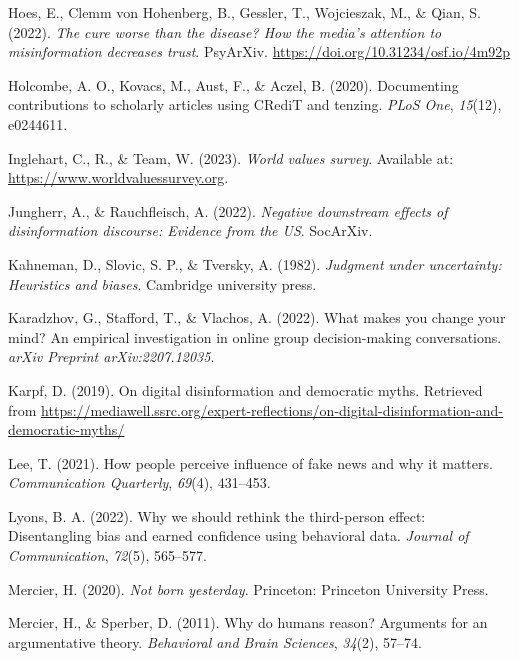 \documentclass[
  ,jou,floatsintext]{apa6}
\newlength{\cslhangindent}
\newlength{\cslentryspacingunit} %
\newenvironment{CSLReferences}[2] %
 {%
  \setlength{\parindent}{0pt}
  \ifodd #1
  \let\oldpar\par
  \def\par{\hangindent=\cslhangindent\oldpar}
  \fi
  \setlength{\parskip}{#2\cslentryspacingunit}
 }%
 {}
\begin{document}
\begin{CSLReferences}{1}{0}
\leavevmode{}%
Hoes, E., Clemm von Hohenberg, B., Gessler, T., Wojcieszak, M., \& Qian, S. (2022). \emph{The cure worse than the disease? How the media's attention to misinformation decreases trust}. PsyArXiv. \url{https://doi.org/10.31234/osf.io/4m92p}

\leavevmode{}%
Holcombe, A. O., Kovacs, M., Aust, F., \& Aczel, B. (2020). Documenting contributions to scholarly articles using CRediT and tenzing. \emph{PLoS One}, \emph{15}(12), e0244611.

\leavevmode{}%
Inglehart, C., R., \& Team, W. (2023). \emph{World values survey}. Available at: \url{https://www.worldvaluessurvey.org}.

\leavevmode{}%
Jungherr, A., \& Rauchfleisch, A. (2022). \emph{Negative downstream effects of disinformation discourse: Evidence from the US}. SocArXiv.

\leavevmode{}%
Kahneman, D., Slovic, S. P., \& Tversky, A. (1982). \emph{Judgment under uncertainty: Heuristics and biases}. Cambridge university press.

\leavevmode{}%
Karadzhov, G., Stafford, T., \& Vlachos, A. (2022). What makes you change your mind? An empirical investigation in online group decision-making conversations. \emph{arXiv Preprint arXiv:2207.12035}.

\leavevmode{}%
Karpf, D. (2019). On digital disinformation and democratic myths. Retrieved from \url{https://mediawell.ssrc.org/expert-reflections/on-digital-disinformation-and-democratic-myths/}

\leavevmode{}%
Lee, T. (2021). How people perceive influence of fake news and why it matters. \emph{Communication Quarterly}, \emph{69}(4), 431--453.

\leavevmode{}%
Lyons, B. A. (2022). Why we should rethink the third-person effect: Disentangling bias and earned confidence using behavioral data. \emph{Journal of Communication}, \emph{72}(5), 565--577.

\leavevmode{}%
Mercier, H. (2020). \emph{Not born yesterday}. Princeton: Princeton University Press.

\leavevmode{}%
Mercier, H., \& Sperber, D. (2011). Why do humans reason? Arguments for an argumentative theory. \emph{Behavioral and Brain Sciences}, \emph{34}(2), 57--74.


\end{CSLReferences}
\end{document}
